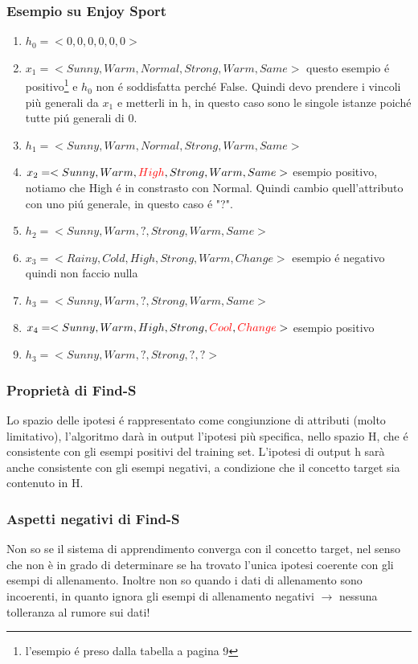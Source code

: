 \documentclass{article}
\begin{document}
\subsubsection{Esempio su Enjoy Sport}
\begin{enumerate}
    \item $h_0 = <0, 0, 0, 0, 0, 0>$
    \item $x_1 = <Sunny, Warm, Normal, Strong, Warm, Same>$ \quad questo esempio é positivo\footnote{l'esempio é preso dalla tabella a pagina 9} e $h_0$ non é soddisfatta perché False. Quindi devo prendere i vincoli più generali da $x_1$ e metterli in h, in questo caso sono le singole istanze poiché tutte piú generali di 0.
    \item $h_1 = <Sunny, Warm, Normal, Strong, Warm, Same>$
    \item $x_2 = <Sunny, Warm, \textcolor{red}{High}, Strong, Warm, Same>$ \quad esempio positivo, notiamo che High é in constrasto con Normal. Quindi cambio quell'attributo con uno piú generale, in questo caso é "?".
    \item $h_2 = <Sunny, Warm, ?, Strong, Warm, Same>$
    \item $x_3 = <Rainy, Cold, High, Strong, Warm, Change>$ \quad esempio é negativo quindi non faccio nulla
    \item $h_3 = <Sunny, Warm, ?, Strong, Warm, Same>$
    \item $x_4 = <Sunny, Warm, High, Strong, \textcolor{red}{Cool}, \textcolor{red}{Change}>$ \quad esempio positivo
    \item $h_3 = <Sunny, Warm, ?, Strong, ?, ?>$
\end{enumerate}

\subsubsection{Proprietà di Find-S}
Lo spazio delle ipotesi é rappresentato come congiunzione di attributi (molto limitativo), l'algoritmo darà in output l'ipotesi più specifica, nello spazio H, che é consistente con gli esempi positivi del training set. L'ipotesi di output h sarà anche consistente con gli esempi negativi, a condizione che il concetto target sia contenuto in H.
\subsubsection{Aspetti negativi di Find-S}
Non so se il sistema di apprendimento converga con il concetto target, nel senso che non è in grado di determinare se ha trovato l'unica ipotesi coerente con gli esempi di allenamento. Inoltre non so quando i dati di allenamento sono incoerenti, in quanto ignora gli esempi di allenamento negativi $\rightarrow$ nessuna tolleranza al rumore sui dati!
\end{document}
